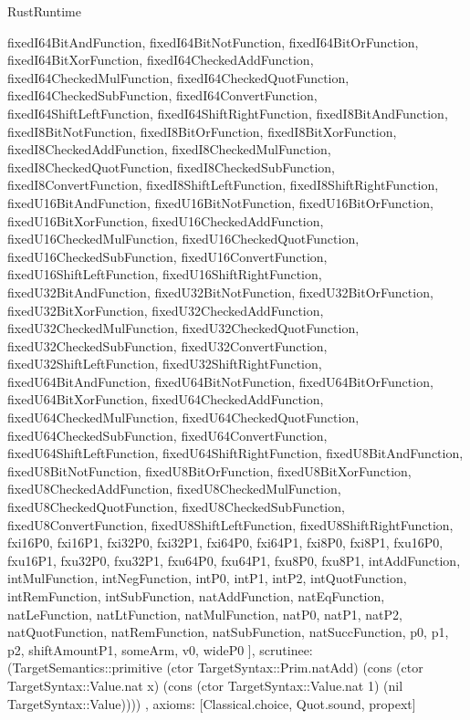 \begin{lexlean}{RustRuntime}
\begin{semanticmodule}
{{      fixedI64BitAndFunction,
      fixedI64BitNotFunction,
      fixedI64BitOrFunction,
      fixedI64BitXorFunction,
      fixedI64CheckedAddFunction,
      fixedI64CheckedMulFunction,
      fixedI64CheckedQuotFunction,
      fixedI64CheckedSubFunction,
      fixedI64ConvertFunction,
      fixedI64ShiftLeftFunction,
      fixedI64ShiftRightFunction,
      fixedI8BitAndFunction,
      fixedI8BitNotFunction,
      fixedI8BitOrFunction,
      fixedI8BitXorFunction,
      fixedI8CheckedAddFunction,
      fixedI8CheckedMulFunction,
      fixedI8CheckedQuotFunction,
      fixedI8CheckedSubFunction,
      fixedI8ConvertFunction,
      fixedI8ShiftLeftFunction,
      fixedI8ShiftRightFunction,
      fixedU16BitAndFunction,
      fixedU16BitNotFunction,
      fixedU16BitOrFunction,
      fixedU16BitXorFunction,
      fixedU16CheckedAddFunction,
      fixedU16CheckedMulFunction,
      fixedU16CheckedQuotFunction,
      fixedU16CheckedSubFunction,
      fixedU16ConvertFunction,
      fixedU16ShiftLeftFunction,
      fixedU16ShiftRightFunction,
      fixedU32BitAndFunction,
      fixedU32BitNotFunction,
      fixedU32BitOrFunction,
      fixedU32BitXorFunction,
      fixedU32CheckedAddFunction,
      fixedU32CheckedMulFunction,
      fixedU32CheckedQuotFunction,
      fixedU32CheckedSubFunction,
      fixedU32ConvertFunction,
      fixedU32ShiftLeftFunction,
      fixedU32ShiftRightFunction,
      fixedU64BitAndFunction,
      fixedU64BitNotFunction,
      fixedU64BitOrFunction,
      fixedU64BitXorFunction,
      fixedU64CheckedAddFunction,
      fixedU64CheckedMulFunction,
      fixedU64CheckedQuotFunction,
      fixedU64CheckedSubFunction,
      fixedU64ConvertFunction,
      fixedU64ShiftLeftFunction,
      fixedU64ShiftRightFunction,
      fixedU8BitAndFunction,
      fixedU8BitNotFunction,
      fixedU8BitOrFunction,
      fixedU8BitXorFunction,
      fixedU8CheckedAddFunction,
      fixedU8CheckedMulFunction,
      fixedU8CheckedQuotFunction,
      fixedU8CheckedSubFunction,
      fixedU8ConvertFunction,
      fixedU8ShiftLeftFunction,
      fixedU8ShiftRightFunction,
      fxi16P0,
      fxi16P1,
      fxi32P0,
      fxi32P1,
      fxi64P0,
      fxi64P1,
      fxi8P0,
      fxi8P1,
      fxu16P0,
      fxu16P1,
      fxu32P0,
      fxu32P1,
      fxu64P0,
      fxu64P1,
      fxu8P0,
      fxu8P1,
      intAddFunction,
      intMulFunction,
      intNegFunction,
      intP0,
      intP1,
      intP2,
      intQuotFunction,
      intRemFunction,
      intSubFunction,
      natAddFunction,
      natEqFunction,
      natLeFunction,
      natLtFunction,
      natMulFunction,
      natP0,
      natP1,
      natP2,
      natQuotFunction,
      natRemFunction,
      natSubFunction,
      natSuccFunction,
      p0,
      p1,
      p2,
      shiftAmountP1,
      someArm,
      v0,
      wideP0
    ],
    scrutinee: (TargetSemantics::primitive (ctor TargetSyntax::Prim.natAdd) (cons (ctor TargetSyntax::Value.nat x) (cons (ctor TargetSyntax::Value.nat 1) (nil TargetSyntax::Value))))
  },
  axioms: [Classical.choice, Quot.sound, propext]
}


\end{semanticmodule}
\end{lexlean}
